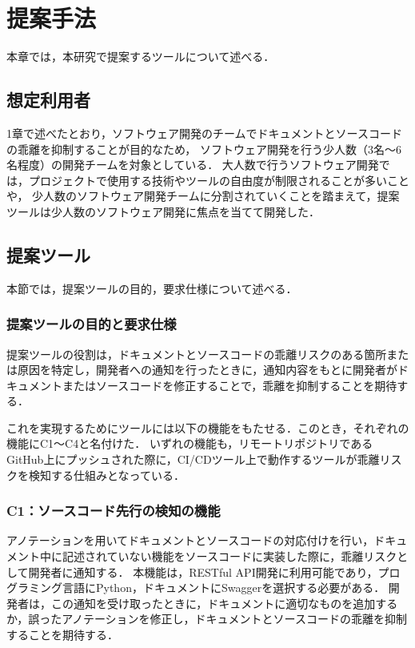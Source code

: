 \chapter{提案手法}
本章では，本研究で提案するツールについて述べる．

\section{想定利用者}
1章で述べたとおり，ソフトウェア開発のチームでドキュメントとソースコードの乖離を抑制することが目的なため，
ソフトウェア開発を行う少人数（3名〜6名程度）の開発チームを対象としている．
大人数で行うソフトウェア開発では，プロジェクトで使用する技術やツールの自由度が制限されることが多いことや，
少人数のソフトウェア開発チームに分割されていくことを踏まえて，提案ツールは少人数のソフトウェア開発に焦点を当てて開発した．

\section{提案ツール}
\label{tool}
本節では，提案ツールの目的，要求仕様について述べる．

\subsection{提案ツールの目的と要求仕様}
提案ツールの役割は，ドキュメントとソースコードの乖離リスクのある箇所または原因を特定し，開発者への通知を行ったときに，通知内容をもとに開発者がドキュメントまたはソースコードを修正することで，乖離を抑制することを期待する．

これを実現するためにツールには以下の機能をもたせる．このとき，それぞれの機能にC1〜C4と名付けた．
いずれの機能も，リモートリポジトリであるGitHub上にプッシュされた際に，CI/CDツール上で動作するツールが乖離リスクを検知する仕組みとなっている．

\subsection{C1：ソースコード先行の検知の機能}
\label{c1}
アノテーションを用いてドキュメントとソースコードの対応付けを行い，ドキュメント中に記述されていない機能をソースコードに実装した際に，乖離リスクとして開発者に通知する．
本機能は，RESTful API開発に利用可能であり，プログラミング言語にPython，ドキュメントにSwaggerを選択する必要がある．
開発者は，この通知を受け取ったときに，ドキュメントに適切なものを追加するか，誤ったアノテーションを修正し，ドキュメントとソースコードの乖離を抑制することを期待する．

